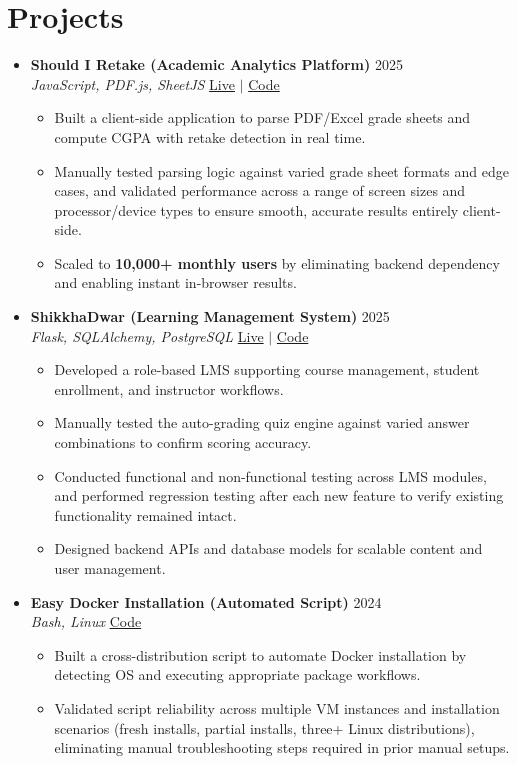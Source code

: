 \documentclass[a4paper]{article}
\newcommand{\resumeItem}[1]{
  \item\small{
    {#1 \vspace{-2pt}}
  }
}
\newcommand{\resumeItemListStart}{\begin{itemize}}
\newcommand{\resumeItemListEnd}{\end{itemize}\vspace{-5pt}}
\begin{document}
\section{Projects}
  \begin{itemize}[leftmargin=0.15in, label={}, itemsep=6pt]

    \item
    \textbf{Should I Retake (Academic Analytics Platform)} \hfill 2025\\
    \small\textit{JavaScript, PDF.js, SheetJS} \hfill
    \href{https://badhon495.github.io/should-i-retake/}{Live} $|$
    \href{https://github.com/badhon495/should-i-retake}{Code}
    \vspace{-5pt}
    \resumeItemListStart
      \resumeItem{Built a client-side application to parse PDF/Excel grade sheets and compute CGPA with retake detection in real time.}
      \resumeItem{Manually tested parsing logic against varied grade sheet formats and edge cases, and validated performance across a range of screen sizes and processor/device types to ensure smooth, accurate results entirely client-side.}
      \resumeItem{Scaled to \textbf{10,000+ monthly users} by eliminating backend dependency and enabling instant in-browser results.}
    \resumeItemListEnd

    \item
    \textbf{ShikkhaDwar (Learning Management System)} \hfill 2025\\
    \small\textit{Flask, SQLAlchemy, PostgreSQL} \hfill
    \href{https://shikkhadwar-81r2.onrender.com/}{Live} $|$
    \href{https://github.com/nihal-kabir/ShikkhaDwar}{Code}
    \vspace{-5pt}
    \resumeItemListStart
      \resumeItem{Developed a role-based LMS supporting course management, student enrollment, and instructor workflows.}
      \resumeItem{Manually tested the auto-grading quiz engine against varied answer combinations to confirm scoring accuracy.}
      \resumeItem{Conducted functional and non-functional testing across LMS modules, and performed regression testing after each new feature to verify existing functionality remained intact.}
      \resumeItem{Designed backend APIs and database models for scalable content and user management.}
    \resumeItemListEnd
    \item
    \textbf{Easy Docker Installation (Automated Script)} \hfill 2024\\
    \small\textit{Bash, Linux} \hfill
    \href{https://github.com/badhon495/Easy_Docker_Installation}{Code}
    \vspace{-5pt}
    \resumeItemListStart
      \resumeItem{Built a cross-distribution script to automate Docker installation by detecting OS and executing appropriate package workflows.}
      \resumeItem{Validated script reliability across multiple VM instances and installation scenarios (fresh installs, partial installs, three+ Linux distributions), eliminating manual troubleshooting steps required in prior manual setups.}
    \resumeItemListEnd
    
  \end{itemize}
\end{document}
